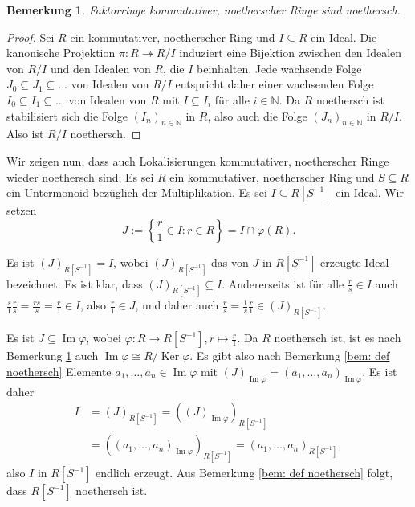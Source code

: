 \documentclass[a4paper,10pt]{article}
\newcounter{satze}
\newtheorem{bem}[satze]{Bemerkung}
\theoremstyle{definition}
\newcommand{\N}{\mathbb{N}}
\newcommand{\Img}{\operatorname{Im}}
\newcommand{\Ker}{\operatorname{Ker}}
\begin{document}
\begin{bem}\label{bem: faktorringe noethersch}
 Faktorringe kommutativer, noetherscher Ringe sind noethersch.
\end{bem}
\begin{proof}
 Sei $R$ ein kommutativer, noetherscher Ring und $I \subseteq R$ ein Ideal. Die kanonische Projektion $\pi : R \twoheadrightarrow R/I$ induziert eine Bijektion zwischen den Idealen von $R/I$ und den Idealen von $R$, die $I$ beinhalten. Jede wachsende Folge $J_0 \subseteq J_1 \subseteq \ldots$ von Idealen von $R/I$ entspricht daher einer wachsenden Folge $I_0 \subseteq I_1 \subseteq \ldots$ von Idealen von $R$ mit $I \subseteq I_i$ für alle $i \in \N$. Da $R$ noethersch ist stabilisiert sich die Folge $(I_n)_{n \in \N}$ in $R$, also auch die Folge $(J_n)_{n \in \N}$ in $R/I$. Also ist $R/I$ noethersch.
\end{proof}


Wir zeigen nun, dass auch Lokalisierungen kommutativer, noetherscher Ringe wieder noethersch sind: Es sei $R$ ein kommutativer, noetherscher Ring und $S \subseteq R$ ein Untermonoid bezüglich der Multiplikation. Es sei $I \subseteq R[S^{-1}]$ ein Ideal. Wir setzen
\[
 J := \left\{ \frac{r}{1} \in I : r \in R \right\} = I \cap \varphi(R).
\]

Es ist $(J)_{R[S^{-1}]} = I$, wobei $(J)_{R[S^{-1}]}$ das von $J$ in $R[S^{-1}]$ erzeugte Ideal bezeichnet. Es ist klar, dass $(J)_{R[S^{-1}]} \subseteq I$. Andererseits ist für alle $\frac{r}{s} \in I$ auch $\frac{s}{1} \frac{r}{s} = \frac{rs}{s} = \frac{r}{1} \in I$, also $\frac{r}{1} \in J$, und daher auch $\frac{r}{s} = \frac{1}{s} \frac{r}{1} \in (J)_{R[S^{-1}]}$.

Es ist $J \subseteq \Img \varphi$, wobei $\varphi : R \rightarrow R[S^{-1}], r \mapsto \frac{r}{1}$. Da $R$ noethersch ist, ist es nach Bemerkung \ref{bem: faktorringe noethersch} auch $\Img \varphi \cong R / \Ker \varphi$. Es gibt also nach Bemerkung \ref{bem: def noethersch} Elemente $a_1, \ldots, a_n \in \Img \varphi$ mit $(J)_{\Img \varphi} = (a_1, \ldots, a_n)_{\Img \varphi}$. Es ist daher
\begin{align*}
 I
 &= (J)_{R[S^{-1}]}
 = ((J)_{\Img \varphi})_{R[S^{-1}]} \\
 &= ((a_1, \ldots, a_n)_{\Img \varphi})_{R[S^{-1}]}
 = (a_1, \ldots, a_n)_{R[S^{-1}]},
\end{align*}
also $I$ in $R[S^{-1}]$ endlich erzeugt. Aus Bemerkung \ref{bem: def noethersch} folgt, dass $R[S^{-1}]$ noethersch ist.
\end{document}
